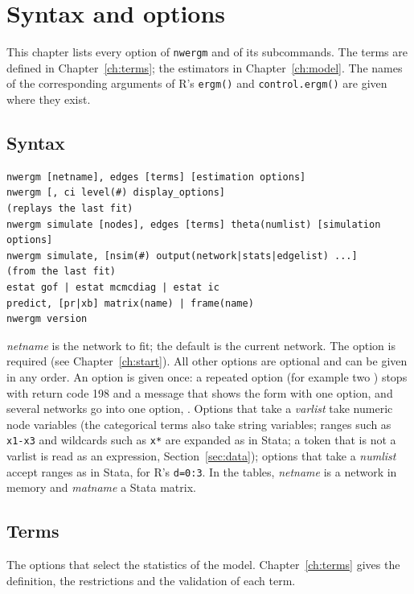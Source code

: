 \chapter{Syntax and options}\label{ch:options}

This chapter lists every option of \texttt{nwergm} and of its subcommands. The terms are defined in Chapter~\ref{ch:terms}; the estimators in Chapter~\ref{ch:model}. The names of the corresponding arguments of R's \texttt{ergm()} and \texttt{control.ergm()} are given where they exist.

\section{Syntax}

\begin{lstlisting}
nwergm [netname], edges [terms] [estimation options]
nwergm [, ci level(#) display_options]                              (replays the last fit)
nwergm simulate [nodes], edges [terms] theta(numlist) [simulation options]
nwergm simulate, [nsim(#) output(network|stats|edgelist) ...]     (from the last fit)
estat gof | estat mcmcdiag | estat ic
predict, [pr|xb] matrix(name) | frame(name)
nwergm version
\end{lstlisting}
\emph{netname} is the network to fit; the default is the current network. The option  is required (see Chapter~\ref{ch:start}). All other options are optional and can be given in any order. An option is given once: a repeated option (for example two ) stops with return code 198 and a message that shows the form with one option, and several networks go into one option, . Options that take a \emph{varlist} take numeric node variables (the categorical terms also take string variables; ranges such as \texttt{x1-x3} and wildcards such as \texttt{x*} are expanded as in Stata; a token that is not a varlist is read as an expression, Section~\ref{sec:data}); options that take a \emph{numlist} accept ranges as in Stata,  for R's \texttt{d=0:3}. In the tables, \emph{netname} is a network in memory and \emph{matname} a Stata matrix.

\section{Terms}

The options that select the statistics of the model. Chapter~\ref{ch:terms} gives the definition, the restrictions and the validation of each term.

